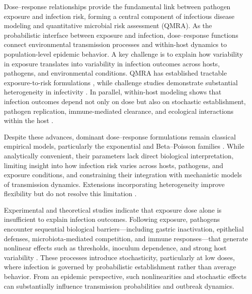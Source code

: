 \documentclass[11pt]{article}
\begin{document}
Dose--response relationships provide the fundamental link between pathogen exposure and infection risk, forming a central component of infectious disease modeling and quantitative microbial risk assessment (QMRA). As the probabilistic interface between exposure and infection, dose--response functions connect environmental transmission processes and within-host dynamics to population-level epidemic behavior. A key challenge is to explain how variability in exposure translates into variability in infection outcomes across hosts, pathogens, and environmental conditions. QMRA has established tractable exposure-to-risk formulations \cite{Haas2014QMRA,Schmidt2013QMRA,Hamilton2024QMRAGaps,Orahovac2026QMRABibliometric}, while challenge studies demonstrate substantial heterogeneity in infectivity \cite{Teunis2008Norovirus,DuPont1995Crypto,Chappell2006Crypto}. In parallel, within-host modeling shows that infection outcomes depend not only on dose but also on stochastic establishment, pathogen replication, immune-mediated clearance, and ecological interactions within the host \cite{Mideo2008WithinHost,Alizon2009VirulenceReview,Smith2011StochasticViruses}.

Despite these advances, dominant dose--response formulations remain classical empirical models, particularly the exponential and Beta--Poisson families \cite{Buchanan2000doseewsponse,Teunis1999GastroenteritisDose}. While analytically convenient, their parameters lack direct biological interpretation, limiting insight into how infection risk varies across hosts, pathogens, and exposure conditions, and constraining their integration with mechanistic models of transmission dynamics. Extensions incorporating heterogeneity improve flexibility but do not resolve this limitation \cite{Teunis2000BetaPoissonNotSingleHit,Haas2002DoseResponse,Xie2016GeneralizedBetaPoisson}.

Experimental and theoretical studies indicate that exposure dose alone is insufficient to explain infection outcomes. Following exposure, pathogens encounter sequential biological barriers---including gastric inactivation, epithelial defenses, microbiota-mediated competition, and immune responses---that generate nonlinear effects such as thresholds, inoculum dependence, and strong host variability \cite{Thaiss2016Microbiome,Postler2020Microbiome,Moore2020InoculumImmune}. These processes introduce stochasticity, particularly at low doses, where infection is governed by probabilistic establishment rather than average behavior. From an epidemic perspective, such nonlinearities and stochastic effects can substantially influence transmission probabilities and outbreak dynamics.
\end{document}

